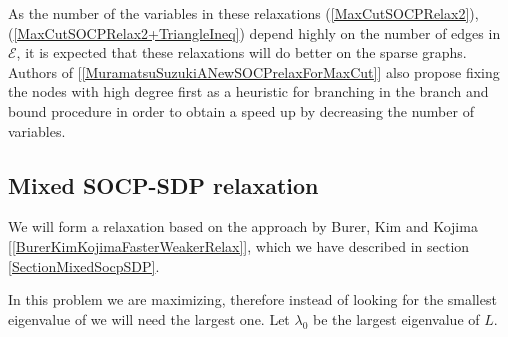 \documentclass[12pt]{book}
\theoremstyle{definition}
\begin{document}
As the number of the variables in these relaxations (\ref{MaxCutSOCPRelax2}), (\ref{MaxCutSOCPRelax2+TriangleIneq}) depend highly on the number of edges in $\mathcal{E}$, it is expected that these relaxations will do better on the sparse graphs. Authors of [\ref{MuramatsuSuzukiANewSOCPrelaxForMaxCut}] also propose fixing the nodes with high degree first as a heuristic for branching in the branch and bound procedure in order to obtain a speed up by decreasing the number of variables.

\subsection{Mixed SOCP-SDP relaxation}

We will form a relaxation based on the approach by Burer, Kim and Kojima  [\ref{BurerKimKojimaFasterWeakerRelax}], which we have described in section \ref{SectionMixedSocpSDP}.

In this problem we are maximizing, therefore instead of looking for the smallest eigenvalue of we will need the largest one. Let  $\lambda_{0}$ be the largest eigenvalue of $L$.

\end{document}
